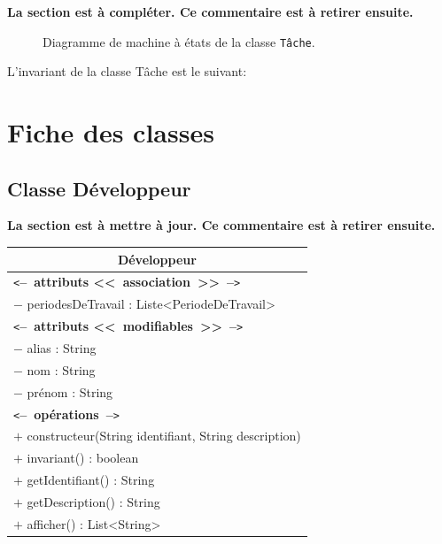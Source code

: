 \documentclass[11pt,article]{article}
\newcommand{\cmt}[1]{\texttt{<}\textbf{--~#1~--}\texttt{>}}
\begin{document}
{\noindent\color{red}\textbf{La section est à compléter. Ce
    commentaire est à retirer ensuite.}}

\begin{figure}[ht!]
\begin{center}
\caption{Diagramme de machine à états de la classe \texttt{Tâche}.}
\end{center}
\label{umlet_diag_machine_a_etats_envoi}
\end{figure}

L'invariant de la classe \textsf{Tâche} est le suivant:

\newpage

\section{Fiche des classes}

\subsection{Classe \textsf{Développeur}}

{\noindent\color{red}\textbf{La section est à mettre à jour. Ce
    commentaire est à retirer ensuite.}}

\begin{center}
\begin{longtable}{|p{12cm}|}
\hline
\multicolumn{1}{|c|}{{\Large \textsf{Développeur}}} \\
\hline
\cmt{attributs <<~association~>>} \\
$-$ periodesDeTravail : Liste<PeriodeDeTravail>\\
\cmt{attributs <<~modifiables~>>}\\
$-$ alias : String \\
$-$ nom : String \\
$-$ prénom : String \\
\hline
\cmt{opérations} \\
$+$ constructeur(String identifiant, String description) \\
$+$ invariant() : boolean \\
$+$ getIdentifiant() : String \\
$+$ getDescription() : String \\
$+$ afficher() : List<String> \\
\hline
\end{longtable}
\end{center}
\end{document}
